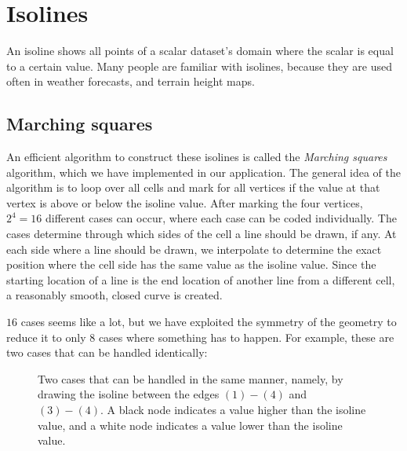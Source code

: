 \section{Isolines}
\label{sec:isolines}
An isoline shows all points of a scalar dataset's domain where the scalar is equal to a certain value.
Many people are familiar with isolines, because they are used often in weather forecasts, and terrain height maps.

\subsection{Marching squares}
An efficient algorithm to construct these isolines is called the \textit{Marching squares}\cite{maple2003geometric} algorithm, which we have implemented in our application.
The general idea of the algorithm is to loop over all cells and mark for all vertices if the value at that vertex is above or below the isoline value.
After marking the four vertices, \(2^4=16\) different cases can occur, where each case can be coded individually.
The cases determine through which sides of the cell a line should be drawn, if any.
At each side where a line should be drawn, we interpolate to determine the exact position where the cell side has the same value as the isoline value.
Since the starting location of a line is the end location of another line from a different cell, a reasonably smooth, closed curve is created.

\(16\) cases seems like a lot, but we have exploited the symmetry of the geometry to reduce it to only \(8\) cases where something has to happen.
For example, these are two cases that can be handled identically:
\begin{figure}[htb]
    \centering
    \caption{Two cases that can be handled in the same manner, namely, by drawing the isoline between the edges \((1)-(4)\) and \((3)-(4)\). A black node indicates a value higher than the isoline value, and a white node indicates a value lower than the isoline value.}
\end{figure}


